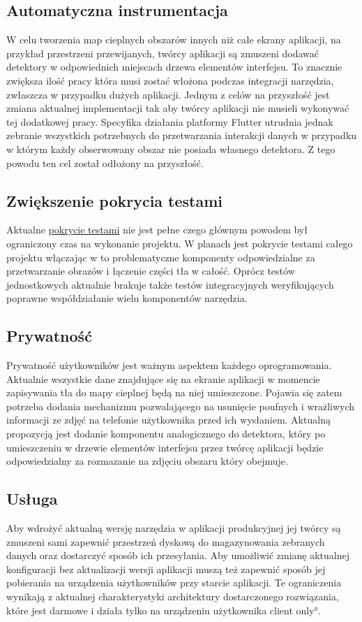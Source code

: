 \subsection{Automatyczna instrumentacja}
\label{sec:auto_instrumentation}
W celu tworzenia map cieplnych obszarów innych niż całe ekrany aplikacji, na przykład przestrzeni przewijanych, twórcy aplikacji są zmuszeni dodawać detektory w odpowiednich miejscach drzewa elementów interfejsu. To znacznie zwiększa ilość pracy która musi zostać włożona podczas integracji narzędzia, zwłaszcza w przypadku dużych aplikacji. Jednym z celów na przyszłość jest zmiana aktualnej implementacji tak aby twórcy aplikacji nie musieli wykonywać tej dodatkowej pracy. Specyfika działania platformy Flutter utrudnia jednak zebranie wszystkich potrzebnych do przetwarzania interakcji danych w przypadku w którym każdy obserwowany obszar nie posiada własnego detektora. Z tego powodu ten cel został odłożony na przyszłość.

\subsection{Zwiększenie pokrycia testami}
\label{sec:future_coverage}
Aktualne \hyperref[par:test_coverage]{pokrycie testami} nie jest pełne czego głównym powodem był ograniczony czas na wykonanie projektu. W planach jest pokrycie testami całego projektu włączając w to problematyczne komponenty odpowiedzialne za przetwarzanie obrazów i łączenie części tła w całość. Oprócz testów jednostkowych aktualnie brakuje także testów integracyjnych weryfikujących poprawne współdziałanie wielu komponentów narzędzia.

\subsection{Prywatność}
Prywatność użytkowników jest ważnym aspektem każdego oprogramowania. Aktualnie wszystkie dane znajdujące się na ekranie aplikacji w momencie zapisywania tła do mapy cieplnej będą na niej umieszczone. Pojawia się zatem potrzeba dodania mechanizmu pozwalającego na usunięcie poufnych i wrażliwych informacji ze zdjęć na telefonie użytkownika przed ich wysłaniem. Aktualną propozycją jest dodanie komponentu analogicznego do detektora, który po umieszczeniu w drzewie elementów interfejsu przez twórcę aplikacji będzie odpowiedzialny za rozmazanie na zdjęciu obszaru który obejmuje.

\subsection{Usługa}
Aby wdrożyć aktualną wersję narzędzia w aplikacji produkcyjnej jej twórcy są zmuszeni sami zapewnić przestrzeń dyskową do magazynowania zebranych danych oraz dostarczyć sposób ich przesyłania. Aby umożliwić zmianę aktualnej konfiguracji bez aktualizacji wersji aplikacji muszą też zapewnić sposób jej pobierania na urządzenia użytkowników przy starcie aplikacji. Te ograniczenia wynikają z aktualnej charakterystyki architektury dostarczonego rozwiązania, które jest darmowe i działa tylko na urządzeniu użytkownika \ang{client only}.

